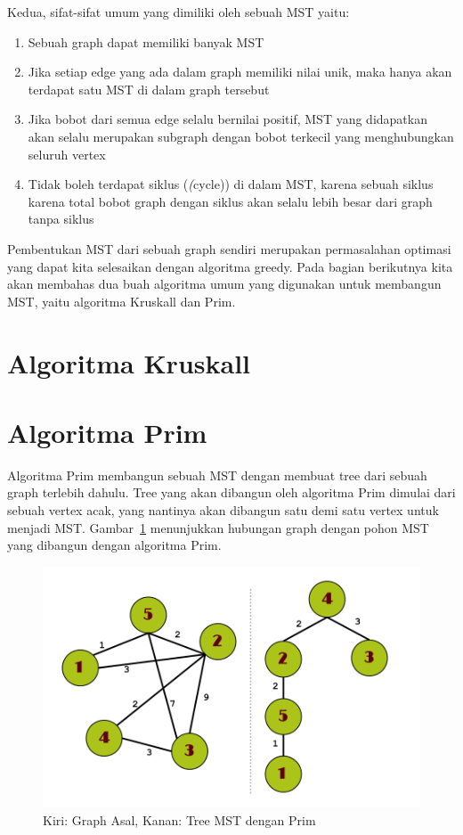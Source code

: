 Kedua, sifat-sifat umum yang dimiliki oleh sebuah MST yaitu:

\begin{enumerate}
    \item Sebuah graph dapat memiliki banyak MST
    \item Jika setiap edge yang ada dalam graph memiliki nilai unik, maka hanya akan terdapat satu MST di dalam graph tersebut
    \item Jika bobot dari semua edge selalu bernilai positif, MST yang didapatkan akan selalu merupakan subgraph dengan bobot terkecil yang menghubungkan seluruh vertex
    \item Tidak boleh terdapat siklus (\textit(cycle)) di dalam MST, karena sebuah siklus karena total bobot graph dengan siklus akan selalu lebih besar dari graph tanpa siklus
\end{enumerate}

Pembentukan MST dari sebuah graph sendiri merupakan permasalahan optimasi yang dapat kita selesaikan dengan algoritma greedy. Pada bagian berikutnya kita akan membahas dua buah algoritma umum yang digunakan untuk membangun MST, yaitu algoritma Kruskall dan Prim.

\section{Algoritma Kruskall}

\section{Algoritma Prim}

Algoritma Prim membangun sebuah MST dengan membuat tree dari sebuah graph terlebih dahulu. Tree yang akan dibangun oleh algoritma Prim dimulai dari sebuah vertex acak, yang nantinya akan dibangun satu demi satu vertex untuk menjadi MST. Gambar~\ref{fig:prims-proc} menunjukkan hubungan graph dengan pohon MST yang dibangun dengan algoritma Prim.

\begin{figure}
    \includegraphics[width=\textwidth,keepaspectratio]{fig/PrimsProc.png}%
	\caption{Kiri: Graph Asal, Kanan: Tree MST dengan Prim}%
	\label{fig:prims-proc}%
\end{figure}

